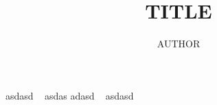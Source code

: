 \documentclass[a4paper,12pt]{article}
\title{TITLE}
\author{AUTHOR}
\begin{document}
\maketitle





asdasd ~\cite{ktk_vortex} asdas
adasd ~\cite{dbg_vortex} asdasd
~\cite{hb_doppler}

{}

\end{document}
